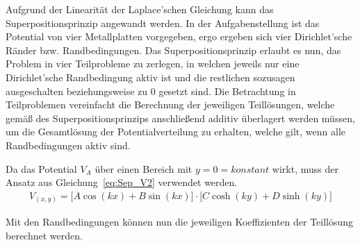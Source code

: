 Aufgrund der Linearität der Laplace'schen Gleichung kann das Superpositionsprinzip angewandt werden. In der Aufgabenstellung ist das Potential von vier Metallplatten vorgegeben, ergo ergeben sich vier Dirichlet'sche Ränder bzw. Randbedingungen. Das Superpositionsprinzip erlaubt es nun, das Problem in vier Teilprobleme zu zerlegen, in welchen jeweils nur eine Dirichlet'sche Randbedingung aktiv ist und die restlichen sozusagen \glqq ausgeschalten\grqq{} beziehungsweise zu $0$ gesetzt sind. Die Betrachtung in Teilproblemen vereinfacht die Berechnung der jeweiligen Teillösungen, welche gemäß des Superpositionsprinzips anschließend additiv überlagert werden müssen, um die Gesamtlösung der Potentialverteilung zu erhalten, welche gilt, wenn alle Randbedingungen aktiv sind. 

Da das Potential $V_A$ über einen Bereich mit $y = 0 = konstant$ wirkt, muss der Ansatz aus Gleichung~\ref{eq:Sep_V2} verwendet werden. 
\begin{align}
	V_{(x,y)} = \bigl[A\cos(kx) + B\sin(kx)\bigr] \cdot \bigl[C\cosh(ky) + D\sinh(ky)\bigr]
\end{align}

Mit den Randbedingungen können nun die jeweiligen Koeffizienten der Teillösung berechnet werden. 

